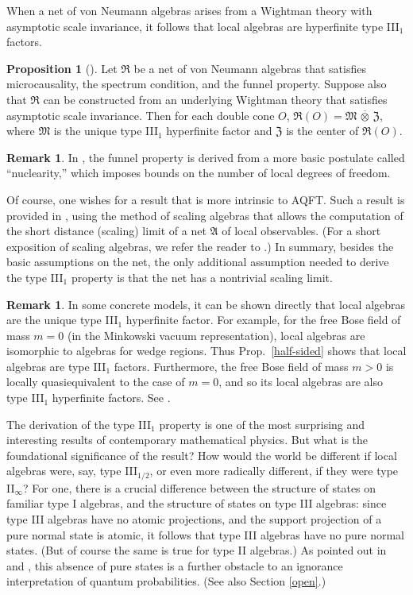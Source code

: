 \documentclass[12pt]{article}
\newcommand{\alg}[1]{\mathfrak{#1}}
\theoremstyle{definition}
\newtheorem{prop}[thm]{Proposition}
\theoremstyle{definition}
\newtheorem{note}[thm]{Remark}
\theoremstyle{remark}
\def\al#1{{\mathfrak #1}}
\begin{document}
When a net of von Neumann algebras arises from a Wightman theory with
asymptotic scale invariance, it follows that local algebras are
hyperfinite type III$_1$ factors.

\begin{prop}[\cite{typeIII}] Let $\al R$ be a net of von Neumann
  algebras that satisfies microcausality, the spectrum condition, and
  the funnel property.  Suppose also that $\al R$ can be constructed
  from an underlying Wightman theory that satisfies asymptotic scale
  invariance.  Then for each double cone $O$, $\al R (O)=\al
  M\,\overline{\otimes}\,\al Z$, where $\al M$ is the unique type
  III$_1$ hyperfinite factor and $\al Z$ is the center of $\al R(O)$.
\end{prop}

\begin{note} In \cite{typeIII}, the funnel property is derived from a
  more basic postulate called ``nuclearity,'' which imposes bounds on
  the number of local degrees of freedom.  \end{note}

Of course, one wishes for a result that is more intrinsic to AQFT.
Such a result is provided in \cite{scaling}, using the method of
scaling algebras that allows the computation of the short distance
(scaling) limit of a net $\alg{A}$ of local observables.  (For a short
exposition of scaling algebras, we refer the reader to \cite{bucky}.)
In summary, besides the basic assumptions on the net, the only
additional assumption needed to derive the type III$_1$ property is
that the net has a nontrivial scaling limit.

\begin{note} In some concrete models, it can be shown directly that
  local algebras are the unique type III$_1$ hyperfinite factor.  For
  example, for the free Bose field of mass $m=0$ (in the Minkowski
  vacuum representation), local algebras are isomorphic to algebras
  for wedge regions.  Thus Prop.\ \ref{half-sided} shows that local
  algebras are type III$_1$ factors.  Furthermore, the free Bose field
  of mass $m>0$ is locally quasiequivalent to the case of $m=0$, and
  so its local algebras are also type III$_1$ hyperfinite factors.
  See \cite[p.\ 254]{horuzhy}.
\end{note}

The derivation of the type III$_1$ property is one of the most
surprising and interesting results of contemporary mathematical
physics.  But what is the foundational significance of the result?
How would the world be different if local algebras were, say, type
III$_{1/2}$, or even more radically different, if they were type
II$_\infty$?  For one, there is a crucial difference between the
structure of states on familiar type I algebras, and the structure of
states on type III algebras: since type III algebras have no atomic
projections, and the support projection of a pure normal state is
atomic, it follows that type III algebras have no pure normal states.
(But of course the same is true for type II algebras.)  As pointed out
in \cite{clif} and \cite{rut}, this absence of pure states is a
further obstacle to an ignorance interpretation of quantum
probabilities.  (See also Section \ref{open}.)  
\end{document}
